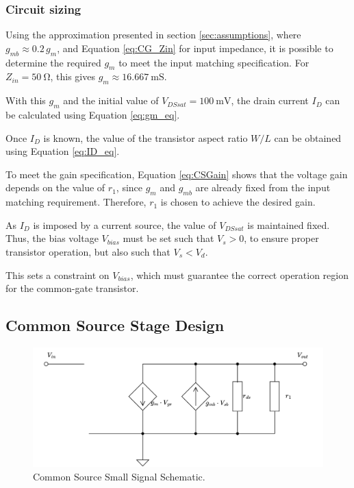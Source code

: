 \subsubsection{Circuit sizing}

Using the approximation presented in section \ref{sec:assumptions}, where $g_{mb} \approx 0.2\,g_m$, and Equation \ref{eq:CG_Zin} for input impedance, it is possible to determine the required $g_m$ to meet the input matching specification. For $Z_{in} = \SI{50}{\ohm}$, this gives $g_m \approx \SI{16.667}{\milli\siemens}$.

With this $g_m$ and the initial value of $V_{DSsat} = \SI{100}{\milli\volt}$, the drain current $I_D$ can be calculated using Equation \ref{eq:gm_eq}.

Once $I_D$ is known, the value of the transistor aspect ratio $W/L$ can be obtained using Equation \ref{eq:ID_eq}.

To meet the gain specification, Equation \ref{eq:CSGain} shows that the voltage gain depends on the value of $r_1$, since $g_m$ and $g_{mb}$ are already fixed from the input matching requirement. Therefore, $r_1$ is chosen to achieve the desired gain.

As $I_D$ is imposed by a current source, the value of $V_{DSsat}$ is maintained fixed. Thus, the bias voltage $V_{bias}$ must be set such that $V_s > 0$, to ensure proper transistor operation, but also such that $V_s < V_d$.

This sets a constraint on $V_{bias}$, which must guarantee the correct operation region for the common-gate transistor.
 
\subsection{Common Source Stage Design}


\begin{figure}[H]
    \centering
    \includegraphics[width=1\textwidth]{Images/CS_SmallSig.png}
    \caption{Common Source Small Signal Schematic.}
    \label{fig:CS_SmallSignal}
\end{figure}

